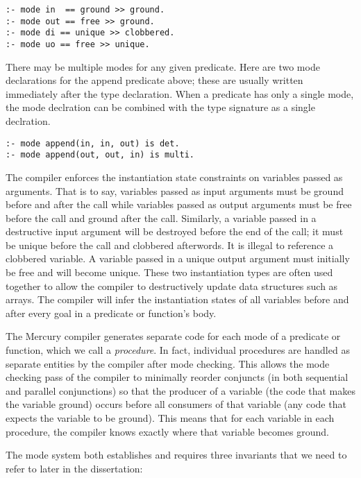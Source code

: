 \begin{verbatim}
:- mode in  == ground >> ground.
:- mode out == free >> ground.
:- mode di == unique >> clobbered.
:- mode uo == free >> unique.
\end{verbatim}

\noindent
There may be multiple modes for any given predicate.
Here are two mode declarations for the append predicate above;
these are usually written immediately after the type declaration.
When a predicate has only a single mode,
the mode declration can be combined with the type signature as a single
declration.

\begin{verbatim}
:- mode append(in, in, out) is det.
:- mode append(out, out, in) is multi.
\end{verbatim}

\noindent
The compiler enforces the instantiation state constraints on variables passed
as arguments.
That is to say,
variables passed as input arguments must be ground before and after the call
while variables passed as output arguments must be free before the call and
ground after the call.
Similarly, a variable passed in a destructive input argument will be destroyed
before the end of the call;
it must be unique before the call and clobbered afterwords. It is illegal to
reference a clobbered variable.
A variable passed in a unique output argument must initially be free and
will become unique.
These two instantiation types are often used together to allow the compiler to
destructively update data structures such as arrays.
The compiler will infer the instantiation states of all variables before and
after every goal in a predicate or function's body.

The Mercury compiler generates separate code
for each mode of a predicate or function,
which we call a \emph{procedure}.
In fact, individual procedures are handled as separate entities by
the compiler after mode checking.
This allows the mode checking pass of the compiler to minimally
reorder conjuncts (in both sequential and parallel conjunctions)
so that the producer of a variable (the code that makes the variable ground)
occurs before all consumers of that variable (any code that expects the
variable to be ground).
This means that for each variable in each procedure,
the compiler knows exactly where that variable becomes ground.

The mode system both establishes and requires three invariants
that we need to refer to later in the dissertation:

